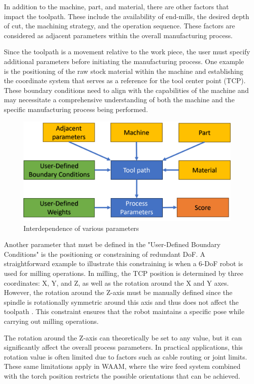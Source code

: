 In addition to the machine, part, and material, there are other factors that impact the toolpath. These include the availability of end-mills, the desired depth of cut, the machining strategy, and the operation sequence. These factors are considered as adjacent parameters within the overall manufacturing process. 


Since the toolpath is a movement relative to the work piece, the user must specify additional parameters before initiating the manufacturing process. One example is the positioning of the raw stock material within the machine and establishing the coordinate system that serves as a reference for the tool center point (TCP). These boundary conditions need to align with the capabilities of the machine and may necessitate a comprehensive understanding of both the machine and the specific manufacturing process being performed.


\begin{figure}[H]
	\centerline{\includegraphics[scale=.6]{figures/BasicScore.png}}
	\caption{Interdependence of various parameters}
	\label{BasicScore}
\end{figure}

Another parameter that must be defined in the "User-Defined Boundary Conditions" is the positioning or constraining of redundant DoF. A straightforward example to illustrate this constraining is when a 6-DoF robot is used for milling operations. In milling, the TCP position is determined by three coordinates: X, Y, and Z, as well as the rotation around the X and Y axes. However, the rotation around the Z-axis must be manually defined since the spindle is rotationally symmetric around this axis and thus does not affect the toolpath . This constraint ensures that the robot maintains a specific pose while carrying out milling operations.

The rotation around the Z-axis can theoretically be set to any value, but it can significantly affect the overall process parameters. In practical applications, this rotation value is often limited due to factors such as cable routing or joint limits. These same limitations apply in WAAM, where the wire feed system combined with the torch position restricts the possible orientations that can be achieved.

